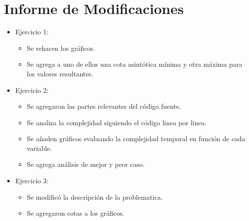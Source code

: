 \section{Informe de Modificaciones}

\begin{itemize}

	\item Ejercicio 1:
	\begin{itemize}
		\item Se rehacen los gráficos.
		\item Se agrega a uno de ellos una cota asintótica mínima y otra máxima para los valores resultantes.
	\end{itemize}
	
	\item Ejercicio 2:
	\begin{itemize}
		\item Se agregaron las partes relevantes del código fuente.
		\item Se analiza la complejidad siguiendo el código linea por linea.
		\item Se a\~naden gráficos evaluando la complejidad temporal en función de cada variable.
		\item Se agrega análisis de mejor y peor caso.
	\end{itemize}
	
	\item Ejercicio 3:
	\begin{itemize}
		\item Se modificó la descripción de la problematica.
		\item Se agregaron cotas a los gráficos.
	\end{itemize}
\end{itemize}